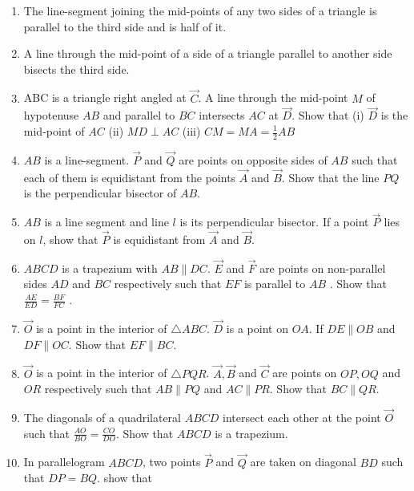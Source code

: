 \begin{enumerate}[label=\thesubsection.\arabic*.,ref=\thesubsection.\theenumi]
\item  The line-segment joining the mid-points of any two sides of a triangle is parallel to the third side and is half of it.
\label{prob:tri_mid_similar}
%
\item  A line through the mid-point of a side of a triangle parallel to another side 
bisects the third side.
\item ABC is a triangle right angled at $\vec{C}$. A line through the mid-point $M$ of hypotenuse $AB$ and parallel to $BC$ intersects $AC$ at $\vec{D}$. Show that (i) $\vec{D}$ is the mid-point of $AC$
(ii) $MD \perp AC$ (iii) $CM = MA = \frac{1}{2}AB$
\item $AB$ is a line-segment. $\vec{P}$ and $\vec{Q}$ are points on opposite sides of $AB$ such that each of them is equidistant from the points $\vec{A}$ and $\vec{B}$. Show that the line $PQ $ is the perpendicular bisector of $AB$.
%
\item $AB$ is a line segment and line $l$ is its perpendicular bisector. If a point $\vec{P}$ lies on $l$, show that $\vec{P}$ is equidistant from $\vec{A}$ and $\vec{B}$.
\item $ABCD$ is a trapezium with $AB  \parallel  DC$. $\vec{E}$ and $\vec{F}$ are points on non-parallel sides $AD$ and $BC$ respectively such that $EF$ is parallel to $AB$
. Show that
$\frac{AE}{ED}=\frac{ BF}{  FC}$ .
\item $\vec{O}$ is a point in the interior of $\triangle ABC$. $\vec{D}$ is a point on $OA$.  If $DE  \parallel  OB$ and $DF  \parallel  OC$. Show that $EF  \parallel  BC$.
\item $\vec{O}$ is a point in the interior of $\triangle PQR$.  $\vec{A}, \vec{B}$ and $\vec{C}$ are points on $OP, OQ$ and $OR$ respectively such that $AB  \parallel  PQ$ and $AC  \parallel  PR$. Show that $BC  \parallel  QR$.
\item The diagonals of a quadrilateral $ABCD$ intersect each other at the point $\vec{O}$ such that $\frac{AO}{ BO}=\frac{CO}{  DO}$.   Show that $ABCD$ is a trapezium.
\item In parallelogram $ABCD$, two points $\vec{P}$ and $\vec{Q}$ are taken on diagonal $BD$ such that $DP = BQ$. show that \begin{enumerate}

\end{enumerate}
\end{enumerate}
